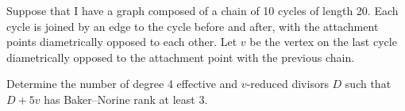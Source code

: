 Suppose that I have a graph composed of a chain of 10 cycles of length 20. Each cycle is joined by an edge to the cycle before and after, with the attachment points diametrically opposed to each other. Let $v$ be the vertex on the last cycle diametrically opposed to the attachment point with the previous chain.

Determine the number of degree 4 effective and $v$-reduced divisors $D$ such that $D + 5v$ has Baker--Norine rank at least 3.
